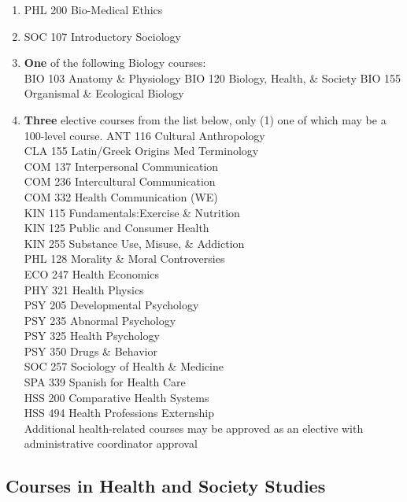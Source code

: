 \documentclass[
  letterpaper,
]{scrbook}
\providecommand{\tightlist}{%
  \setlength{\itemsep}{0pt}\setlength{\parskip}{0pt}}
\begin{document}
\begin{enumerate}
\def\labelenumi{\arabic{enumi}.}
\tightlist
\item
  PHL 200 Bio-Medical Ethics\\
\item
  SOC 107 Introductory Sociology\\
\item
  \textbf{One} of the following Biology courses:\\
  BIO 103 Anatomy \& Physiology BIO 120 Biology, Health, \& Society BIO
  155 Organismal \& Ecological Biology\\
\item
  \textbf{Three} elective courses from the list below, only (1) one of
  which may be a 100-level course. ANT 116 Cultural Anthropology\\
  CLA 155 Latin/Greek Origins Med Terminology\\
  COM 137 Interpersonal Communication\\
  COM 236 Intercultural Communication\\
  COM 332 Health Communication (WE)\\
  KIN 115 Fundamentals:Exercise \& Nutrition\\
  KIN 125 Public and Consumer Health\\
  KIN 255 Substance Use, Misuse, \& Addiction\\
  PHL 128 Morality \& Moral Controversies\\
  ECO 247 Health Economics\\
  PHY 321 Health Physics\\
  PSY 205 Developmental Psychology\\
  PSY 235 Abnormal Psychology\\
  PSY 325 Health Psychology\\
  PSY 350 Drugs \& Behavior\\
  SOC 257 Sociology of Health \& Medicine\\
  SPA 339 Spanish for Health Care\\
  HSS 200 Comparative Health Systems\\
  HSS 494 Health Professions Externship\\
  Additional health-related courses may be approved as an elective with
  administrative coordinator approval
\end{enumerate}

\subsection{Courses in Health and Society
Studies}\label{courses-in-health-and-society-studies}
\end{document}
